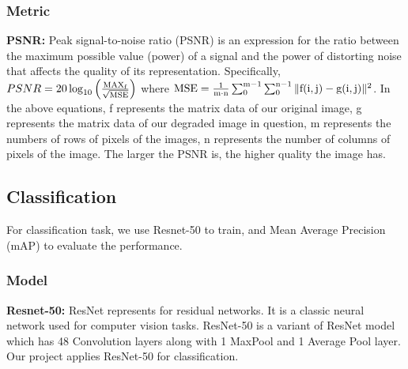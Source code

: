 \documentclass[10pt,twocolumn,letterpaper]{article}
\begin{document}
\subsubsection{Metric}
{\bf PSNR:} Peak signal-to-noise ratio (PSNR) is an expression for the ratio between the maximum possible value (power) of a signal and the power of distorting noise that affects the quality of its representation. Specifically, $P S N R=20 \log _{10}\left(\frac{\rm{M A X}_{f}}{\sqrt{\rm{M S E}}}\right)$ where $\rm{M S E}=\frac{1}{m\cdot n} \sum_{0}^{m-1} \sum_{0}^{n-1}\|f(i, j)-g(i, j)\|^{2}$. In the above equations, f represents the matrix data of our original image, g represents the matrix data of our degraded image in question, m represents the numbers of rows of pixels of the images, n represents the number of columns of pixels of the image. The larger the PSNR is, the higher quality the image has.

\subsection{Classification}
For classification task, we use Resnet-50 to train, and Mean Average Precision (mAP) to evaluate the performance.

\subsubsection{Model}
{\bf Resnet-50: }ResNet represents for residual networks. It is a classic neural network used for computer vision tasks. ResNet-50 is a variant of ResNet model which has 48 Convolution layers along with 1 MaxPool and 1 Average Pool layer. Our project applies ResNet-50 for classification.
\end{document}
